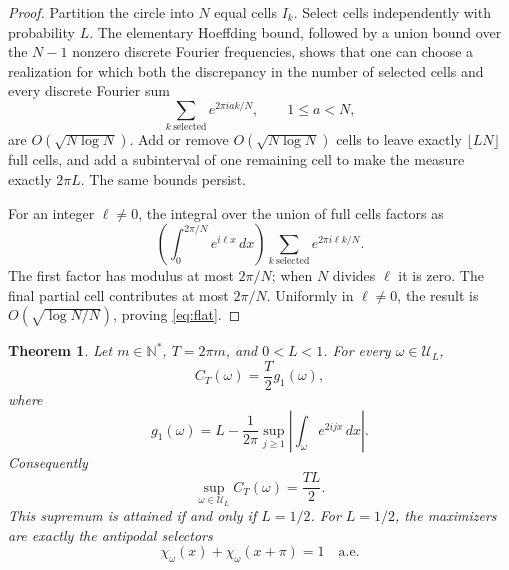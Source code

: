 \documentclass[11pt]{article}
\newtheorem{theorem}{Theorem}
\newcommand{\N}{\mathbb N}
\newcommand{\Ucal}{\mathcal U}
\begin{document}
\begin{proof}
Partition the circle into $N$ equal cells $I_k$.  Select cells independently
with probability $L$.  The elementary Hoeffding bound, followed by a union
bound over the $N-1$ nonzero discrete Fourier frequencies, shows that one can
choose a realization for which both the discrepancy in the number of selected
cells and every discrete Fourier sum
\[
 \sum_{k\ \mathrm{selected}}e^{2\pi iak/N},\qquad 1\leq a<N,
\]
are $O(\sqrt{N\log N})$.  Add or remove
$O(\sqrt{N\log N})$ cells to leave exactly $\lfloor LN\rfloor$ full cells,
and add a subinterval of one remaining cell to make the measure exactly
$2\pi L$.  The same bounds persist.

For an integer $\ell\neq0$, the integral over the union of full cells factors
as
\[
 \left(\int_0^{2\pi/N}e^{i\ell x}\,dx\right)
 \sum_{k\ \mathrm{selected}}e^{2\pi i\ell k/N}.
\]
The first factor has modulus at most $2\pi/N$; when $N$ divides $\ell$ it is
zero.  The final partial cell contributes at most $2\pi/N$.  Uniformly in
$\ell\neq0$, the result is $O(\sqrt{\log N/N})$, proving
\eqref{eq:flat}.
\end{proof}

\begin{theorem}\label{thm:C}
Let $m\in\N^*$, $T=2\pi m$, and $0<L<1$.  For every
$\omega\in\Ucal_L$,
\begin{equation}\label{eq:exactC}
 C_T(\omega)=\frac{T}{2}g_1(\omega),
\end{equation}
where
\begin{equation}\label{eq:g1fourier}
 g_1(\omega)=L-\frac1{2\pi}\sup_{j\geq1}
 \left|\int_\omega e^{2ijx}\,dx\right|.
\end{equation}
Consequently
\[
 \sup_{\omega\in\Ucal_L}C_T(\omega)=\frac{TL}{2}.
\]
This supremum is attained if and only if $L=1/2$.  For $L=1/2$, the maximizers
are exactly the antipodal selectors
\begin{equation}\label{eq:selector}
 \chi_\omega(x)+\chi_\omega(x+\pi)=1\quad\text{a.e.}
\end{equation}
\end{theorem}
\end{document}
